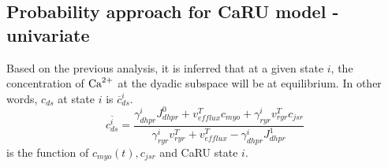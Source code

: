 \subsection{Probability approach for CaRU model - univariate}
\label{sec:prob-appr-caru}

Based on the previous analysis, it is inferred that at a given state
$i$, the concentration of ${\text{Ca}^{2+}}$ at the dyadic subspace will be at
equilibrium. In other words, $c_{ds}$ at state $i$ is
$\overline{c}^i_{ds}$. 
\begin{equation}
  \label{eq:223}
   \overline{c^i_{ds}} = \frac{\gamma^i_{dhpr}J^0_{dhpr}+v^T_{efflux}c_{myo}+\gamma^i_{ryr}v^T_{ryr}c_{jsr}}{\gamma^i_{ryr} v^T_{ryr} + v^T_{efflux}
      - \gamma^i_{dhpr}J^1_{dhpr}}
\end{equation}
is the function of $c_{myo}(t), c_{jsr}$ and CaRU state $i$.


